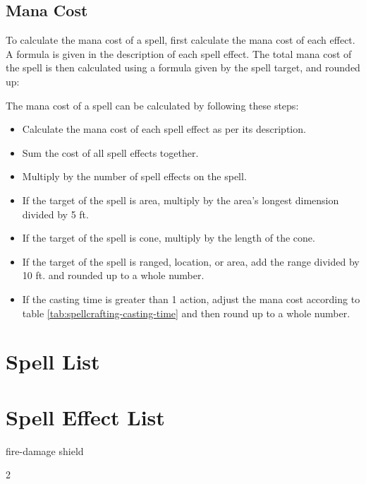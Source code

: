 \begin{multicols*}{2}
    \subsection{Mana Cost}
    To calculate the mana cost of a spell, first calculate the mana cost of
    each effect. A formula is given in the description of each spell effect.
    The total mana cost of the spell is then calculated using a formula given
    by the spell target, and rounded up:

    The mana cost of a spell can be calculated by following these steps:
    \begin{itemize}
        \item Calculate the mana cost of each spell effect as per its
            description.
        \item Sum the cost of all spell effects together.
        \item Multiply by the number of spell effects on the spell.
        \item If the target of the spell is area, multiply by the area's
            longest dimension divided by 5 ft.
        \item If the target of the spell is cone, multiply by the length of
            the cone.
        \item If the target of the spell is ranged, location, or area,
            add the range divided by 10 ft. and rounded up to a
            whole number.
        \item If the casting time is greater than 1 action, adjust the mana
            cost according to table \ref{tab:spellcrafting-casting-time} and
            then round up to a whole number.
    \end{itemize}
    
    \section{Spell List}

    \section{Spell Effect List}
    {fire-damage}
    {shield}

\end{multicols*}{2}
